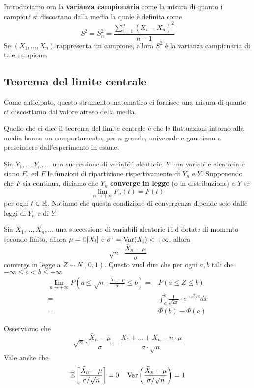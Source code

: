 Introduciamo ora la \textbf{varianza campionaria} come la misura di quanto i campioni si
discostano dalla media la quale è definita come
\[ S^2 = S_n^2 = \frac{\sum_{i=1}^n \left( X_i - \bar{X}_n \right)^2}{n - 1} \]
Se $(X_1, \dots, X_n)$ rappresenta un campione, allora $S^2$ è la varianza campionaria di tale
campione.

\subsection{Teorema del limite centrale}
Come anticipato, questo strumento matematico ci fornisce una misura di quanto ci discostiamo dal
valore atteso della media.

Quello che ci dice il teorema del limite centrale è che le fluttuazioni intorno alla media
hanno un comportamento, per $n$ grande, universale e gaussiano a prescindere dall'esperimento in
esame.

\begin{definition}
	Sia $Y_1, \dots, Y_n, \dots$ una successione di variabili aleatorie, $Y$ una variabile
	aleatoria e siano $F_n$ ed $F$ le funzioni di ripartizione rispettivamente di $Y_n$ e $Y$.
	Supponendo che $F$ sia continua, diciamo che $Y_n$ \textbf{converge in legge} (o in
	distribuzione) a $Y$ se
	\[ \lim_{n \to +\infty} F_n (t) = F(t) \]
	per ogni $t \in \mathbb{R}$. Notiamo che questa condizione di convergenza dipende solo dalle leggi di
	$Y_n$ e di $Y$.
\end{definition}

\begin{theorem}\label{th: tlc}
	Sia $X_1, \dots, X_n, \dots$ una successione di variabili aleatorie i.i.d dotate di momento
	secondo finito, allora $\mu = \mathbb{E}[X_i]$ e $\sigma^2 = \operatorname{Var}(X_i) < +\infty$, allora
	\[ \sqrt{n} \cdot \frac{\bar{X}_n - \mu}{\sigma} \]
	converge in legge a $Z \sim N(0,1)$. Questo vuol dire che per ogni $a, b$ tali che
	$-\infty \leq a < b \leq +\infty$
	\begin{align*}
		\lim_{n \to +\infty} P \left( a \leq \sqrt{n} \cdot \frac{\bar{X}_n - \mu}{\sigma}
		\leq b \right) = & P(a \leq Z \leq b)                                      \\
		=                & \int_{a}^{b} \frac{1}{\sqrt{2 \pi}} \cdot e^{-x^2/2} dx \\
		=                & \Phi(b) - \Phi(a)
	\end{align*}
\end{theorem}

\begin{observation}
	Osserviamo che
	\[
		\sqrt{n} \cdot \frac{\bar{X}_n - \mu}{\sigma} =
		\frac{X_1 + \dots + X_n - n \cdot \mu}{\sigma \cdot \sqrt{n}}
	\]
	Vale anche che
	\[
		\mathbb{E} \left[ \frac{\bar{X}_n - \mu}{\sigma / \sqrt{n}} \right] = 0 \quad
		\operatorname{Var} \left( \frac{\bar{X}_n - \mu}{\sigma / \sqrt{n}} \right) = 1
	\]
\end{observation}

